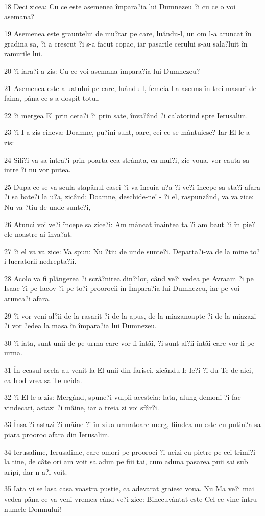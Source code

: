 \par 18 Deci zicea: Cu ce este asemenea împara?ia lui Dumnezeu ?i cu ce o voi asemana?
\par 19 Asemenea este grauntelui de mu?tar pe care, luându-l, un om l-a aruncat în gradina sa, ?i a crescut ?i s-a facut copac, iar pasarile cerului s-au sala?luit în ramurile lui.
\par 20 ?i iara?i a zis: Cu ce voi asemana împara?ia lui Dumnezeu?
\par 21 Asemenea este aluatului pe care, luându-l, femeia l-a ascuns în trei masuri de faina, pâna ce s-a dospit totul.
\par 22 ?i mergea El prin ceta?i ?i prin sate, înva?ând ?i calatorind spre Ierusalim.
\par 23 ?i I-a zis cineva: Doamne, pu?ini sunt, oare, cei ce se mântuiesc? Iar El le-a zis:
\par 24 Sili?i-va sa intra?i prin poarta cea strâmta, ca mul?i, zic voua, vor cauta sa intre ?i nu vor putea.
\par 25 Dupa ce se va scula stapânul casei ?i va încuia u?a ?i ve?i începe sa sta?i afara ?i sa bate?i la u?a, zicând: Doamne, deschide-ne! - ?i el, raspunzând, va va zice: Nu va ?tiu de unde sunte?i,
\par 26 Atunci voi ve?i începe sa zice?i: Am mâncat înaintea ta ?i am baut ?i în pie?ele noastre ai înva?at.
\par 27 ?i el va va zice: Va spun: Nu ?tiu de unde sunte?i. Departa?i-va de la mine to?i lucratorii nedrepta?ii.
\par 28 Acolo va fi plângerea ?i scrâ?nirea din?ilor, când ve?i vedea pe Avraam ?i pe Isaac ?i pe Iacov ?i pe to?i proorocii în Împara?ia lui Dumnezeu, iar pe voi arunca?i afara.
\par 29 ?i vor veni al?ii de la rasarit ?i de la apus, de la miazanoapte ?i de la miazazi ?i vor ?edea la masa în împara?ia lui Dumnezeu.
\par 30 ?i iata, sunt unii de pe urma care vor fi întâi, ?i sunt al?ii întâi care vor fi pe urma.
\par 31 În ceasul acela au venit la El unii din farisei, zicându-I: Ie?i ?i du-Te de aici, ca Irod vrea sa Te ucida.
\par 32 ?i El le-a zis: Mergând, spune?i vulpii acesteia: Iata, alung demoni ?i fac vindecari, astazi ?i mâine, iar a treia zi voi sfâr?i.
\par 33 Însa ?i astazi ?i mâine ?i în ziua urmatoare merg, fiindca nu este cu putin?a sa piara prooroc afara din Ierusalim.
\par 34 Ierusalime, Ierusalime, care omori pe prooroci ?i ucizi cu pietre pe cei trimi?i la tine, de câte ori am voit sa adun pe fiii tai, cum aduna pasarea puii sai sub aripi, dar n-a?i voit.
\par 35 Iata vi se lasa casa voastra pustie, ca adevarat graiesc voua. Nu Ma ve?i mai vedea pâna ce va veni vremea când ve?i zice: Binecuvântat este Cel ce vine întru numele Domnului!

